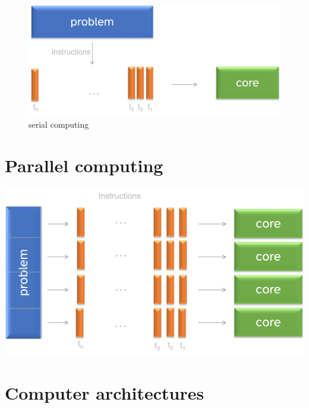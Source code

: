 \documentclass[
  letterpaper,
  DIV=11,
  numbers=noendperiod,
  oneside]{scrreprt}
\begin{document}
\begin{figure}

{\centering \includegraphics{chs-command-line/imgs-cli/serial-computing.png}

}

\caption{serial computing}

\end{figure}

\hypertarget{parallel-computing}{%
\section{Parallel computing}\label{parallel-computing}}

\includegraphics{chs-command-line/imgs-cli/parallel-computing.png}

\hypertarget{computer-architectures}{%
\section{Computer architectures}\label{computer-architectures}}
\end{document}
